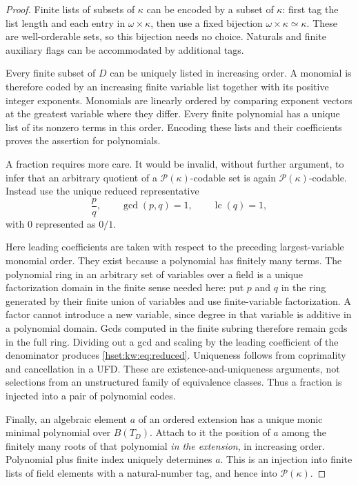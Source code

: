 \documentclass[11pt,letterpaper]{article}
\theoremstyle{definition}
\theoremstyle{remark}
\newcommand{\Pow}{\mathcal P}
\newcommand{\lc}{\operatorname{lc}}
\begin{document}
\begin{proof}
Finite lists of subsets of $\kappa$ can be encoded by a subset of $\kappa$: first tag the list length and each entry in $\omega\times\kappa$, then use a fixed bijection $\omega\times\kappa\simeq\kappa$. These are well-orderable sets, so this bijection needs no choice. Naturals and finite auxiliary flags can be accommodated by additional tags.

Every finite subset of $D$ can be uniquely listed in increasing order. A monomial is therefore coded by an increasing finite variable list together with its positive integer exponents. Monomials are linearly ordered by comparing exponent vectors at the greatest variable where they differ. Every finite polynomial has a unique list of its nonzero terms in this order. Encoding these lists and their coefficients proves the assertion for polynomials.

A fraction requires more care. It would be invalid, without further argument, to infer that an arbitrary quotient of a $\Pow(\kappa)$-codable set is again $\Pow(\kappa)$-codable. Instead use the unique reduced representative
\begin{equation}\label{hset:kw:eq:reduced}
\frac{p}{q},\qquad \gcd(p,q)=1,\qquad\lc(q)=1,
\end{equation}
with $0$ represented as $0/1$.

Here leading coefficients are taken with respect to the preceding largest-variable monomial order. They exist because a polynomial has finitely many terms. The polynomial ring in an arbitrary set of variables over a field is a unique factorization domain in the finite sense needed here: put $p$ and $q$ in the ring generated by their finite union of variables and use finite-variable factorization. A factor cannot introduce a new variable, since degree in that variable is additive in a polynomial domain. Gcds computed in the finite subring therefore remain gcds in the full ring. Dividing out a gcd and scaling by the leading coefficient of the denominator produces \eqref{hset:kw:eq:reduced}. Uniqueness follows from coprimality and cancellation in a UFD. These are existence-and-uniqueness arguments, not selections from an unstructured family of equivalence classes. Thus a fraction is injected into a pair of polynomial codes.

Finally, an algebraic element $a$ of an ordered extension has a unique monic minimal polynomial over $B(T_D)$. Attach to it the position of $a$ among the finitely many roots of that polynomial \emph{in the extension}, in increasing order. Polynomial plus finite index uniquely determines $a$. This is an injection into finite lists of field elements with a natural-number tag, and hence into $\Pow(\kappa)$.
\end{proof}
\end{document}
